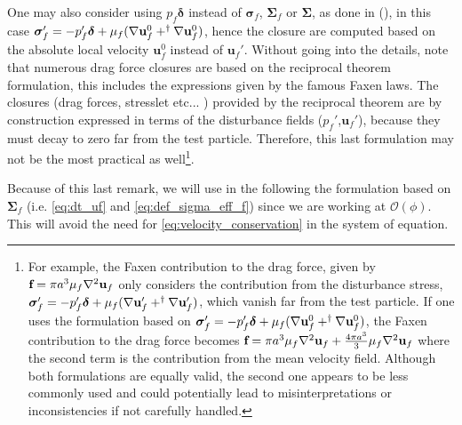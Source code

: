 One may also consider using $p_f\bm\delta$ instead of $\bm\sigma_f$, $\bm\Sigma_f$ or $\bm\Sigma$, as done in \citet{morel2015mathematical} (), in this case $\bm\sigma_f'  = -p_f' \bm\delta + \mu_f (\mathbf{\nabla} \textbf{u}_f^0 + ^\dagger \mathbf{\nabla} \textbf{u}_f^0)$, hence the closure are computed based on the absolute local velocity $\textbf{u}_f^0$ instead of $\textbf{u}_f'$.
Without going into the details, note that numerous drag force closures are based on the reciprocal theorem formulation, this includes the expressions given by the famous Faxen laws.
The closures (drag forces, stresslet etc... ) provided by the reciprocal theorem are by construction expressed in terms of the disturbance fields ($p_f'$,$\textbf{u}_f'$), because they must decay to zero far from the test particle. 
Therefore, this last formulation may not be the most practical as well\footnote{
For example, the Faxen contribution to the drag force, given by $\textbf{f} = \pi a^3 \mu_f \mathbf{\nabla}^2 \textbf{u}_f$ only considers the contribution from the disturbance stress, $\bm\sigma_f'  = -p_f' \bm\delta + \mu_f (\mathbf{\nabla} \textbf{u}_f' + ^\dagger \mathbf{\nabla} \textbf{u}_f')$, which vanish far from the test particle. 
If one uses the formulation based on $\bm\sigma_f'  = -p_f' \bm\delta + \mu_f (\mathbf{\nabla} \textbf{u}_f^0 + ^\dagger \mathbf{\nabla} \textbf{u}_f^0)$, the Faxen contribution to the drag force becomes $\textbf{f} = \pi a^3 \mu_f \mathbf{\nabla}^2 \textbf{u}_f + \frac{4\pi a^3}{3}\mu_f \mathbf{\nabla}^2 \textbf{u}_f$ where the second term is the contribution from the mean velocity field.
Although both formulations are equally valid, the second one appears to be less commonly used and could potentially lead to misinterpretations or inconsistencies if not carefully handled. 
}. 



Because of this last remark, we will use in the following the formulation based on $\bm\Sigma_f$ (i.e. \ref{eq:dt_uf} and \ref{eq:def_sigma_eff_f}) since we are working at $\mathcal{O}(\phi)$.
This will avoid the need for \ref{eq:velocity_conservation} in the system of equation. 


